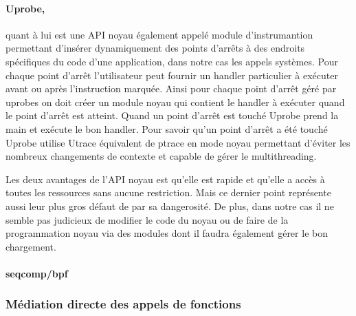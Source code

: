 \paragraph{Uprobe,}
quant à lui est une API noyau également appelé module d'instrumantion permettant
d'insérer dynamiquement des points d'arrêts à des endroits spécifiques du code
d'une application, dans notre cas les appels systèmes. Pour chaque point d'arrêt
l’utilisateur peut fournir un handler particulier à exécuter avant ou après
l’instruction marquée. Ainsi pour chaque point d'arrêt géré par uprobes on doit
créer un module noyau qui contient le handler à exécuter quand le point d'arrêt
est atteint. Quand un point d'arrêt est touché Uprobe prend la main et exécute
le bon handler. Pour savoir qu'un point d'arrêt a été touché Uprobe utilise
Utrace équivalent de ptrace en mode noyau permettant d'éviter les nombreux
changements de contexte et capable de gérer le multithreading.

Les deux avantages de l'API noyau est qu'elle est rapide et qu'elle a accès à
toutes les ressources sans aucune restriction. Mais ce dernier point représente
aussi leur plus gros défaut de par sa dangerosité. De plus, dans notre cas il ne
semble pas judicieux de modifier le code du noyau ou de faire de la
programmation noyau via des modules dont il faudra également gérer le bon
chargement.

\paragraph{seqcomp/bpf}



\subsubsection{Médiation directe des appels de fonctions}
